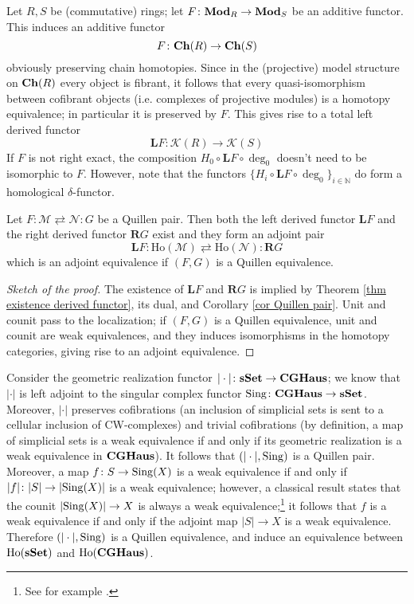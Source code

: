 \begin{eg}
Let $R, S$ be (commutative) rings; let $F \colon \mathbf{Mod}_R \to \mathbf{Mod}_S$ be an additive functor. This induces an additive functor
\[
F \colon \mathbf{Ch}(R) \to \mathbf{Ch}(S)
\]
obviously preserving chain homotopies. Since in the (projective) model structure on $\mathbf{Ch}(R)$ every object is fibrant, it follows that every quasi-isomorphism between cofibrant objects (i.e. complexes of projective modules) is a homotopy equivalence; in particular it is preserved by $F$. This gives rise to a total left derived functor
\[
\mathbf L F \colon \mathcal K(R) \to \mathcal K(S)
\]
If $F$ is not right exact, the composition $H_0 \circ \mathbf L F \circ \deg_0$ doesn't need to be isomorphic to $F$. However, note that the functors $\{H_i \circ \mathbf LF \circ \deg_0\}_{i \in \mathbb N}$ do form a homological $\delta$-functor.
\end{eg}

\begin{thm} \label{thm quillen adjuntion}
Let $F \colon \mathcal M \rightleftarrows \mathcal N \colon G$ be a Quillen pair. Then both the left derived functor $\mathbf L F$ and the right derived functor $\mathbf R G$ exist and they form an adjoint pair
\[
\mathbf L F \colon \mathrm{Ho}(\mathcal M) \rightleftarrows \mathrm{Ho}(\mathcal N) \colon \mathbf R G
\]
which is an adjoint equivalence if $(F,G)$ is a Quillen equivalence.
\end{thm}

\begin{proof}[Sketch of the proof]
The existence of $\mathbf L F$ and $\mathbf R G$ is implied by Theorem \ref{thm existence derived functor}, its dual, and Corollary \ref{cor Quillen pair}. Unit and counit pass to the localization; if $(F,G)$ is a Quillen equivalence, unit and counit are weak equivalences, and they induces isomorphisms in the homotopy categories, giving rise to an adjoint equivalence.
\end{proof}

\begin{eg}
Consider the geometric realization functor $|\cdot| \colon \mathbf{sSet} \to \mathbf{CGHaus}$; we know that $|\cdot|$ is left adjoint to the singular complex functor $\mathrm{Sing} \colon \mathbf{CGHaus} \to \mathbf{sSet}$. Moreover, $|\cdot|$ preserves cofibrations (an inclusion of simplicial sets is sent to a cellular inclusion of CW-complexes) and trivial cofibrations (by definition, a map of simplicial sets is a weak equivalence if and only if its geometric realization is a weak equivalence in $\mathbf{CGHaus}$). It follows that $(|\cdot|,\mathrm{Sing})$ is a Quillen pair. Moreover, a map $f \colon S \to \mathrm{Sing}(X)$ is a weak equivalence if and only if $|f| \colon |S| \to |\mathrm{Sing}(X)|$ is a weak equivalence; however, a classical result states that the counit $|\mathrm{Sing}(X)| \to X$ is always a weak equivalence;\footnote{See for example \cite[Theorem 16.6]{may}.} it follows that $f$ is a weak equivalence if and only if the adjoint map $|S| \to X$ is a weak equivalence. Therefore $(|\cdot|,\mathrm{Sing})$ is a Quillen equivalence, and induce an equivalence between $\mathrm{Ho}(\mathbf{sSet})$ and $\mathrm{Ho}(\mathbf{CGHaus})$.
\end{eg}

